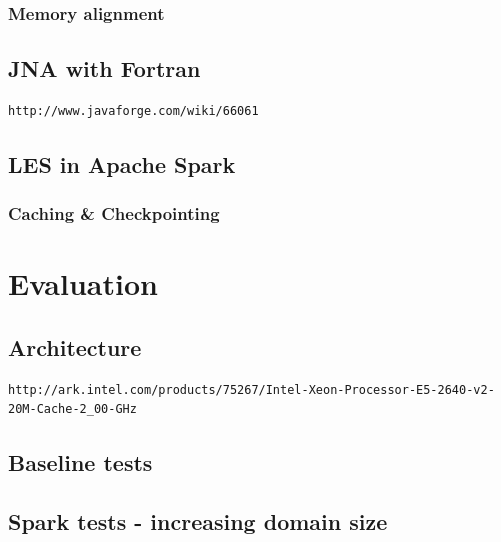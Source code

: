 \documentclass{l4proj}
\begin{document}
\subsection{Memory alignment}

\section{JNA with Fortran}

\begin{verbatim}
http://www.javaforge.com/wiki/66061
\end{verbatim}

\section{LES in Apache Spark}

\subsection{Caching \& Checkpointing}

\chapter{Evaluation}
\label{chap:eval}

\section{Architecture}

\begin{verbatim}
http://ark.intel.com/products/75267/Intel-Xeon-Processor-E5-2640-v2-20M-Cache-2_00-GHz
\end{verbatim}

\section{Baseline tests}

\section{Spark tests - increasing domain size}

\end{document}
